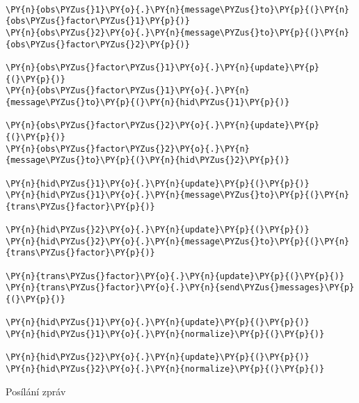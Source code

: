 \begin{example}
\begin{Verbatim}[commandchars=\\\{\}]

\PY{n}{obs\PYZus{}1}\PY{o}{.}\PY{n}{message\PYZus{}to}\PY{p}{(}\PY{n}{obs\PYZus{}factor\PYZus{}1}\PY{p}{)}
\PY{n}{obs\PYZus{}2}\PY{o}{.}\PY{n}{message\PYZus{}to}\PY{p}{(}\PY{n}{obs\PYZus{}factor\PYZus{}2}\PY{p}{)}

\PY{n}{obs\PYZus{}factor\PYZus{}1}\PY{o}{.}\PY{n}{update}\PY{p}{(}\PY{p}{)}
\PY{n}{obs\PYZus{}factor\PYZus{}1}\PY{o}{.}\PY{n}{message\PYZus{}to}\PY{p}{(}\PY{n}{hid\PYZus{}1}\PY{p}{)}

\PY{n}{obs\PYZus{}factor\PYZus{}2}\PY{o}{.}\PY{n}{update}\PY{p}{(}\PY{p}{)}
\PY{n}{obs\PYZus{}factor\PYZus{}2}\PY{o}{.}\PY{n}{message\PYZus{}to}\PY{p}{(}\PY{n}{hid\PYZus{}2}\PY{p}{)}

\PY{n}{hid\PYZus{}1}\PY{o}{.}\PY{n}{update}\PY{p}{(}\PY{p}{)}
\PY{n}{hid\PYZus{}1}\PY{o}{.}\PY{n}{message\PYZus{}to}\PY{p}{(}\PY{n}{trans\PYZus{}factor}\PY{p}{)}

\PY{n}{hid\PYZus{}2}\PY{o}{.}\PY{n}{update}\PY{p}{(}\PY{p}{)}
\PY{n}{hid\PYZus{}2}\PY{o}{.}\PY{n}{message\PYZus{}to}\PY{p}{(}\PY{n}{trans\PYZus{}factor}\PY{p}{)}

\PY{n}{trans\PYZus{}factor}\PY{o}{.}\PY{n}{update}\PY{p}{(}\PY{p}{)}
\PY{n}{trans\PYZus{}factor}\PY{o}{.}\PY{n}{send\PYZus{}messages}\PY{p}{(}\PY{p}{)}

\PY{n}{hid\PYZus{}1}\PY{o}{.}\PY{n}{update}\PY{p}{(}\PY{p}{)}
\PY{n}{hid\PYZus{}1}\PY{o}{.}\PY{n}{normalize}\PY{p}{(}\PY{p}{)}

\PY{n}{hid\PYZus{}2}\PY{o}{.}\PY{n}{update}\PY{p}{(}\PY{p}{)}
\PY{n}{hid\PYZus{}2}\PY{o}{.}\PY{n}{normalize}\PY{p}{(}\PY{p}{)}               
\end{Verbatim}
\caption{Posílání zpráv}
\label{lst:facmsg}
\end{example}

%
%
%
%
%
%
%

